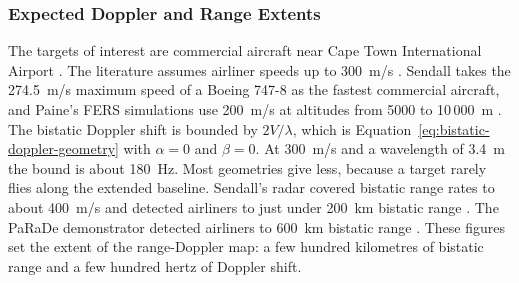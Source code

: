 \subsubsection{Expected Doppler and Range Extents}
\label{subsubsec:ch2.pbr.aircraft.extents}
\todo{}
The targets of interest are commercial aircraft near Cape Town International Airport . The literature assumes airliner speeds up to 300~m/s \citep{malanowski2014,tong2014}. Sendall \citep{sendall2016} takes the 274.5~m/s maximum speed of a Boeing 747-8 as the fastest commercial aircraft, and Paine's FERS simulations use 200~m/s at altitudes from 5000 to 10\,000~m \citep{paine2019a}. The bistatic Doppler shift is bounded by $2V/\lambda$, which is Equation~\ref{eq:bistatic-doppler-geometry} with $\alpha = 0$ and $\beta = 0$. At 300~m/s and a wavelength of 3.4~m the bound is about 180~Hz. Most geometries give less, because a target rarely flies along the extended baseline. Sendall's radar covered bistatic range rates to about 400~m/s and detected airliners to just under 200~km bistatic range \citep{sendall2016}. The PaRaDe demonstrator detected airliners to 600~km bistatic range \citep{malanowski2014}. These figures set the extent of the range-Doppler map: a few hundred kilometres of bistatic range and a few hundred hertz of Doppler shift.


